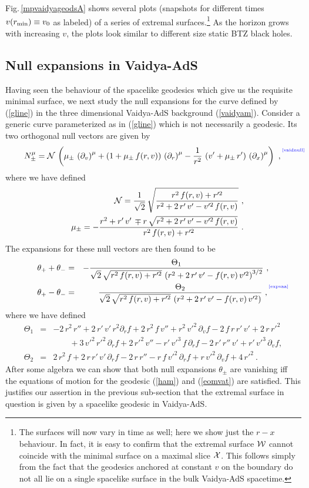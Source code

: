 \documentclass[12pt]{article}
\def\fig#1{Fig.\,\ref{#1}}
\def\req#1{(\ref{#1})}
\def\({\left (}
\def\){\right )}
\def\p{\partial}
\def\s{\sigma}
\def\CN{{\cal N}}
\def\CW{{\cal W}}
\def\CX{{\cal X}}
\def\p{\partial}
\def\f#1#2{{\frac{#1}{#2}}}
\def\f#1#2{{\frac{#1}{#2}}}
\def\p{\partial}
\def\Label#1{\label{#1}%
{ \color{blue}{\smash{\hbox to0pt{\raise2ex\hbox{\tiny[#1]}\hss}}}}}
\def\Gms{\CW}
\def\Xms{\CX}
\def\rmin{r_{\rm min}}
\def\s{\sqrt}
\def\f {\frac}
\def\no{\nonumber \\}
\def\ba{\begin{eqnarray}}
\def\ea{\end{eqnarray}}
\begin{document}
%
\fig{mpvaidyageodsA} shows several plots (snapshots for different times
$v(\rmin) \equiv v_0$ as labeled) of a series of extremal surfaces.\footnote{The surfaces will now vary in time as well; here we show just the
$r -x$ behaviour.  In fact, it is easy to confirm that the extremal surface $\Gms$ cannot coincide with the minimal surface on a maximal slice $\Xms$. This follows simply from the fact that the geodesics anchored at constant $v$ on the boundary do not all lie on a single spacelike surface in the bulk Vaidya-AdS spacetime.} As the horizon grows with increasing $v$, the
plots look similar to different size static BTZ black holes.

\subsection{Null expansions in Vaidya-AdS}

Having seen the behaviour of the spacelike geodesics which give us
the requisite minimal surface, we next study the null expansions for
the curve defined by \req{gline} in the three dimensional Vaidya-AdS
background \req{vaidyam}. Consider a generic curve parameterized as
in \req{gline} which is not necessarily a geodesic. Its two
orthogonal null vectors are given by
%
\begin{equation}
N^\mu_{\pm} = \CN \, \( \mu_{\pm}\, \(\p_v\)^\mu +(1 + \mu_{\pm}\,
f(r,v))\, \(\p_r\)^\mu - {1\over r^2}\, \(v' + \mu_{\pm} \, r'\) \,
\(\p_x\)^\mu \)  \ , \Label{vaidnull}
\end{equation}
%
where we have defined
\ba &&{\cal{N}}=\f{1}{\s{2}}\, \s{\f{r^2\, f(r,v)+r'^2}{r^2+2\,r'\,v'-v'^2\,
f(r,v)}}\ ,\no &&\mu_{\pm}=-\f{r^2+r'\, v'\, \mp r\, \s{r^2+2\,
r'\, v'-v'^2\,  f(r,v)}}{r^2\,f(r,v)+r'^2} \ . \ea
%
The expansions for these null vectors are then found to be
%
 \ba
\theta_+ +\theta_- &=& -\f{\Theta_{1}}{\s{2}\, \s{r^2\, f(r,v)+r'^2}\,
\(r^2+2\,r'\,v'-f(r,v)\, v'^2\)^{3/2}} \ ,\cr
\theta_+ -\theta_-  &=& \f{\Theta_2}{\s{2}\, \s{r^2\, f(r,v)+r'^2}\,
\(r^2+2\, r'\, v'-f(r,v)\, v'^2\)} \ , \Label{expvaa} \ea
%
where we have defined
%
\ba  \Theta_1 &=& - 2\,  r^2\, r'' + 2\, r'\, v' \, r^2 \p_r f+ 2
\,r^2 \,f \, v'' + r^2 \,v'^2 \, \p_v f - 2\,f\,r \, r'\,v' + 2\,
r\, r'^2 \no &&\qquad+ 3\,v'^2\, r'^2 \,\p_r f + 2 \,r'^2\, v'' - r'
\,v'^3 \,f\,\p_r f - 2 \,r'\, r''\, v' + r'\,v'^3 \,\p_v f, \no
\Theta_2 &=& 2\,r^2 \,f + 2\,r\, r'\,v'\,\p_r f -2\, r\, r'' - r\,
f\, v'^2\,\p_r f + r\, v'^2 \,\p_v f + 4 \,r'^2 \ . \ea
%
After some algebra we can show that both null expansions
$\theta_{\pm}$ are vanishing iff the equations of motion for the
geodesic \req{ham} and \req{eomvat} are satisfied. This justifies our assertion
in the previous sub-section that the extremal surface in question is given by a
spacelike geodesic in Vaidya-AdS.
\end{document}
